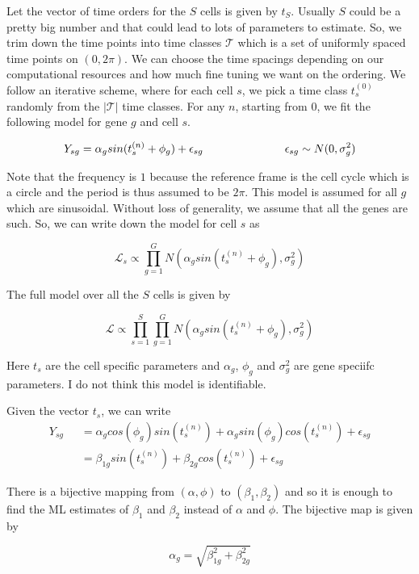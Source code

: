 \documentclass[11pt]{article}
\begin{document}
Let the vector of time orders for the $S$ cells is given by $t_{S}$. Usually $S$ could be a pretty big number and that could lead to lots of parameters to estimate. So, we trim down the time points into time classes $\mathcal{T}$ which is a set of uniformly spaced time points on $(0, 2 \pi)$. We can choose the time spacings depending on our computational resources and how much fine tuning we want on the ordering. We follow an iterative scheme, where for each cell $s$, we pick a time class $t^{(0)}_{s}$ randomly from the $ | \mathcal{T} |$ time classes. For any $n$, starting from $0$, we fit the following model for gene $g$ and cell $s$.

$$ Y_{sg} = \alpha_g sin (t^{(n)}_s + \phi_g) + \epsilon_{sg}  \hspace{1 in}  \epsilon_{sg} \sim N(0, \sigma^2_{g}) $$

Note that the frequency is $1$ because the reference frame is the cell cycle which is a circle and the period is thus assumed to be $2 \pi$. This model is assumed for all $g$ which are sinusoidal. Without loss of generality, we assume that all the genes are such. So, we can write down the model  for cell $s$ as

$$ \mathcal{L}_{s}  \propto \prod_{g=1}^{G} N \left ( \alpha_g sin (t^{(n)}_s + \phi_g), \sigma^2_{g} \right )  $$

The full model over all the $S$ cells is given by

$$ \mathcal{L} \propto \prod_{s=1}^{S} \prod_{g=1}^{G} N \left ( \alpha_g sin (t^{(n)}_s + \phi_g), \sigma^2_{g} \right ) $$

Here $t_s$ are the cell specific parameters and $\alpha_g$, $\phi_g$ and $\sigma^2_g$ are gene speciifc parameters. I do not think this model is identifiable.

Given the vector $t_s$, we can write
\begin{align*}
Y_{sg}  & = \alpha_g  cos(\phi_g) sin (t^{(n)}_s) + \alpha_g sin (\phi_g) cos(t^{(n)}_s) + \epsilon_{sg}   \\
\qquad & = \beta_{1g} sin(t^{(n)}_s) + \beta_{2g} cos(t^{(n)}_s) + \epsilon_{sg}  \end{align*}



There is a bijective mapping from $(\alpha,\phi)$ to $(\beta_1, \beta_2)$ and so it is enough to find the ML estimates of $\beta_1$ and $\beta_2$ instead of $\alpha$ and $\phi$. The bijective map is given by

$$ \alpha_g = \sqrt{\beta^2_{1g} + \beta^2_{2g} }$$
\end{document}
